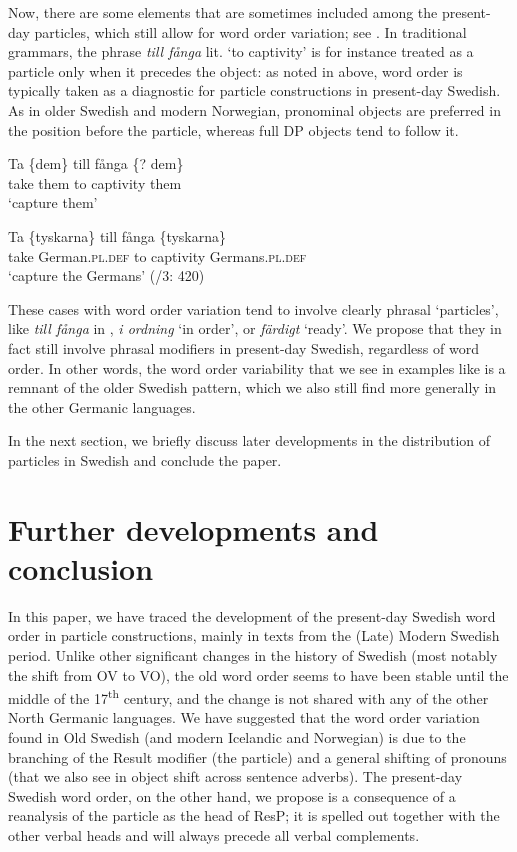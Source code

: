 \documentclass[output=paper]{langscibook}
\begin{document}
Now, there are some elements that are sometimes included among the present-day particles, which still allow for word order variation; see . In traditional grammars, the phrase \textit{till fånga} lit. ‘to captivity’ is for instance treated as a particle only when it precedes the object: as noted in  above, word order is typically taken as a diagnostic for particle constructions in present-day Swedish. As in older Swedish and modern Norwegian, pronominal objects are preferred in the position before the particle, whereas full DP objects tend to follow it.


\ea\label{ex:lalu:63}
\ea
\gll Ta   \{dem\}   till   fånga       \{? dem\}\\
    take   them     to     captivity    {}   them\\
\glt `capture them'

\ex
\gll Ta   \{tyskarna\}       till   fånga     \{tyskarna\}\\
 take   German\textsc{.pl.def}   to     captivity     Germans\textsc{.pl.def}\\
\glt `capture the Germans’ (\citealt{TelemanEtAl1999}/3: 420)\\
\z
\z


These cases with word order variation tend to involve clearly phrasal ‘particles’, like \textit{till fånga} in , \textit{i ordning} ‘in order’, or \textit{färdigt} ‘ready’. We propose that they in fact still involve phrasal modifiers in present-day Swedish, regardless of word order. In other words, the word order variability that we see in examples like  is a remnant of the older Swedish pattern, which we also still find more generally in the other Germanic languages.



In the next section, we briefly discuss later developments in the distribution of particles in Swedish and conclude the paper.


\section{Further developments and conclusion}\label{sec:lalu:7}


In this paper, we have traced the development of the present-day Swedish word order in particle constructions, mainly in texts from the (Late) Modern Swedish period. Unlike other significant changes in the history of Swedish (most notably the shift from OV to VO), the old word order seems to have been stable until the middle of the 17\textsuperscript{th} century, and the change is not shared with any of the other North Germanic languages. We have suggested that the word order variation found in Old Swedish (and modern Icelandic and Norwegian) is due to the branching of the Result modifier (the particle) and a general shifting of pronouns (that we also see in object shift across sentence adverbs). The present-day Swedish word order, on the other hand, we propose is a consequence of a reanalysis of the particle as the head of ResP; it is spelled out together with the other verbal heads and will always precede all verbal complements. 
\end{document}
